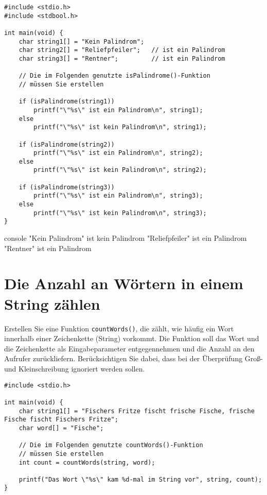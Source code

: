 \Vorlage
\begin{verbatim}
#include <stdio.h>
#include <stdbool.h>

int main(void) {
    char string1[] = "Kein Palindrom";
    char string2[] = "Reliefpfeiler";   // ist ein Palindrom
    char string3[] = "Rentner";         // ist ein Palindrom

    // Die im Folgenden genutzte isPalindrome()-Funktion
    // müssen Sie erstellen

    if (isPalindrome(string1))
        printf("\"%s\" ist ein Palindrom\n", string1);
    else
        printf("\"%s\" ist kein Palindrom\n", string1);

    if (isPalindrome(string2))
        printf("\"%s\" ist ein Palindrom\n", string2);
    else
        printf("\"%s\" ist kein Palindrom\n", string2);

    if (isPalindrome(string3))
        printf("\"%s\" ist ein Palindrom\n", string3);
    else
        printf("\"%s\" ist kein Palindrom\n", string3);
}
\end{verbatim}

\begin{mybox}[Bildschirmausgabe]{console}
    "Kein Palindrom" ist kein Palindrom
    "Reliefpfeiler" ist ein Palindrom
    "Rentner" ist ein Palindrom
\end{mybox}




\chapter{Die Anzahl an Wörtern in einem String zählen}

\vspace{10pt}

Erstellen Sie eine Funktion \texttt{countWords()}, die zählt, wie häufig
ein Wort innerhalb einer Zeichenkette (String) vorkommt. Die Funktion soll das
Wort und die Zeichenkette als Eingabeparameter entgegennehmen und die Anzahl an
den Aufrufer zurückliefern. Berücksichtigen Sie dabei, dass bei der Überprüfung
Groß- und Kleinschreibung ignoriert werden sollen.

\Vorlage
\begin{verbatim}
#include <stdio.h>

int main(void) {
    char string1[] = "Fischers Fritze fischt frische Fische, frische Fische fischt Fischers Fritze";
    char word[] = "Fische";

    // Die im Folgenden genutzte countWords()-Funktion
    // müssen Sie erstellen
    int count = countWords(string, word);

    printf("Das Wort \"%s\" kam %d-mal im String vor", string, count);
}
\end{verbatim}

